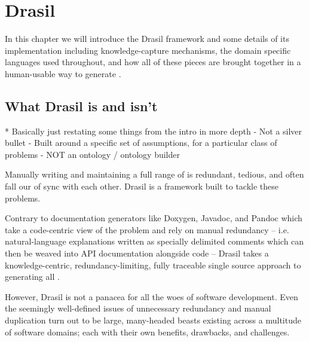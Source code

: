 \chapter{Drasil}


In this chapter we will introduce the Drasil framework and some details of its 
implementation including knowledge-capture mechanisms, the domain specific 
languages used throughout, and how all of these pieces are brought together in 
a human-usable way to generate \sfs{}.
      
\section{What Drasil is and isn't}
  * Basically just restating some things from the intro in more depth
  - Not a silver bullet
  - Built around a specific set of assumptions, for a particular class of problems
  - NOT an ontology / ontology builder

Manually writing and maintaining a full range of \sfs{} is
redundant, tedious, and often \sfs{} fall our of sync with each other. 
Drasil is a framework built to tackle these problems.

Contrary to documentation generators like Doxygen, Javadoc, and Pandoc
which take a code-centric view of the problem and rely on manual redundancy -- 
i.e. natural-language explanations written as specially delimited
comments which can then be weaved into API documentation alongside code -- 
Drasil takes a knowledge-centric, redundancy-limiting, fully traceable single 
source approach to generating all \sfs{}.

However, Drasil is not a panacea for all the woes of software development. Even 
the seemingly well-defined issues of unnecessary redundancy and manual 
duplication turn out to be large, many-headed beasts existing across a 
multitude of software domains; each with their own benefits, drawbacks, and 
challenges.

